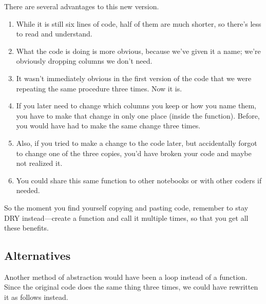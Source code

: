 \documentclass[letterpaper,10pt,english]{jupyterBook}
\begin{document}
\sphinxAtStartPar
There are several advantages to this new version.
\begin{enumerate}
%
\item {} 
\sphinxAtStartPar
While it is still six lines of code, half of them are much shorter, so there’s less to read and understand.

\item {} 
\sphinxAtStartPar
What the code is doing is more obvious, because we’ve given it a name; we’re obviously dropping columns we don’t need.

\item {} 
\sphinxAtStartPar
It wasn’t immediately obvious in the first version of the code that we were repeating the same procedure three times.  Now it is.

\item {} 
\sphinxAtStartPar
If you later need to change which columns you keep or how you name them, you have to make that change in only one place (inside the function).  Before, you would have had to make the same change three times.

\item {} 
\sphinxAtStartPar
Also, if you tried to make a change to the code later, but accidentally forgot to change one of the three copies, you’d have broken your code and maybe not realized it.

\item {} 
\sphinxAtStartPar
You could share this same function to other notebooks or with other coders if needed.

\end{enumerate}

\sphinxAtStartPar
So the moment you find yourself copying and pasting code, remember to stay DRY instead—create a function and call it multiple times, so that you get all these benefits.


\subsection{Alternatives}
\label{\detokenize{chapter-7-abstraction:alternatives}}
\sphinxAtStartPar
Another method of abstraction would have been a loop instead of a function.  Since the original code does the same thing three times, we could have rewritten it as follows instead.
\end{document}

